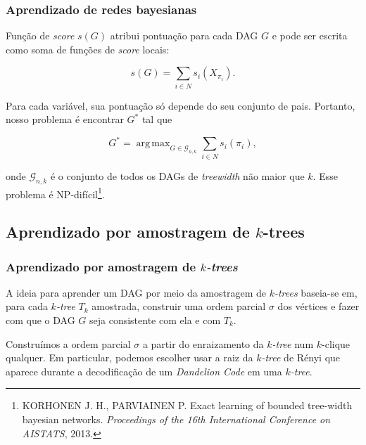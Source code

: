\documentclass{beamer}
\DeclareMathOperator*{\argmax}{arg\,max}
\begin{document}
  \begin{frame}[fragile=singleslide]
    \frametitle{Aprendizado de redes bayesianas}

    Função de \emph{score} $s(G)$ atribui pontuação para cada DAG $G$ e pode ser escrita como soma de funções de \emph{score} locais:

    {\footnotesize
    $$s(G) = \sum_{i \in N} s_i(X_{\pi_i}).$$
    }

    Para cada variável, sua pontuação só depende do seu conjunto de pais. Portanto, nosso problema é encontrar $G^*$ tal que

    {\footnotesize
    $$G^* = \argmax_{G \in \mathcal{G}_{n,k}} \sum_{i \in N} s_i(\pi_i),$$
    }

    onde $\mathcal{G}_{n,k}$ é o conjunto de todos os DAGs de \emph{treewidth} não maior que $k$. Esse problema é NP-difícil\footnote{\scriptsize KORHONEN J. H., PARVIAINEN P. Exact learning of bounded tree-width bayesian networks. \emph{Proceedings of the 16th International Conference on AISTATS}, 2013.}.
  \end{frame}

  \subsection{Aprendizado por amostragem de $k$-trees}

  \begin{frame}
    \frametitle{Aprendizado por amostragem de \emph{$k$-trees}}

    A ideia para aprender um DAG por meio da amostragem de \emph{$k$-trees} baseia-se em, para cada \emph{$k$-tree} $T_k$ amostrada, construir uma ordem parcial $\sigma$ dos vértices e fazer com que o DAG $G$ seja consistente com ela e com $T_k$.

    \vspace{1em}

    Construímos a ordem parcial $\sigma$ a partir do enraizamento da \emph{$k$-tree} num $k$-clique qualquer. Em particular, podemos escolher usar a raiz da \emph{$k$-tree} de Rényi que aparece durante a decodificação de um \emph{Dandelion Code} em uma \emph{$k$-tree}.
  \end{frame}
\end{document}
